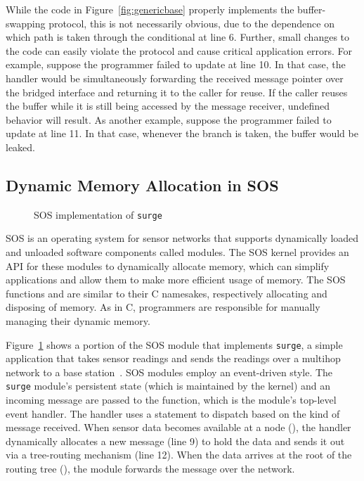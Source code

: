While the code in Figure~\ref{fig:genericbase} properly implements the
buffer-swapping protocol, this is not necessarily obvious, due to the
dependence on which path is taken through the conditional at line 6.  
%
Further, small changes to the code can easily violate the protocol and cause
critical application errors.  
%
For example, suppose the programmer failed to update
 at line 10.
%
In that case, the handler would be simultaneously forwarding the received
message pointer over the bridged interface and returning it to the caller
for reuse.  
%
If the caller reuses the buffer while it is still being accessed by the
message receiver, undefined behavior will result.
%
As another example, suppose the programmer failed to update 
at line 11.  In that case, whenever the  branch is taken, the
 buffer would be leaked.



\subsection{Dynamic Memory Allocation in SOS}



\begin{figure}[t]

\caption{SOS implementation of {\tt surge}\label{fig:surge}}
\end{figure}



SOS is an operating system for sensor networks that supports dynamically
loaded and unloaded software components called modules.
%
The SOS kernel provides an API for these modules to dynamically allocate
memory, which can simplify applications and allow them to make more
efficient usage of memory.
%
The SOS functions  and  are similar to
their C namesakes, respectively allocating and disposing of memory.  
%
As in C, programmers are responsible for manually managing their dynamic
memory.  



Figure~\ref{fig:surge} shows a portion of the SOS module that implements
{\tt surge}, a simple application that takes sensor readings and sends the
readings over a multihop network to a base station~\cite{nesC}.  
%
SOS modules employ an event-driven style.  
%
The {\tt surge} module's persistent state (which is maintained by the
kernel) and an incoming message are passed to the 
function, which is the module's top-level event handler.  
%
The handler uses a  statement to dispatch based on the kind of
message received.  
%
When sensor data becomes available at a node (), the
handler dynamically allocates a new message (line 9) to hold the data and
sends it out via a tree-routing mechanism (line 12).  
%
When the data arrives at the root of the routing tree
(), the module forwards the message over the
network.



